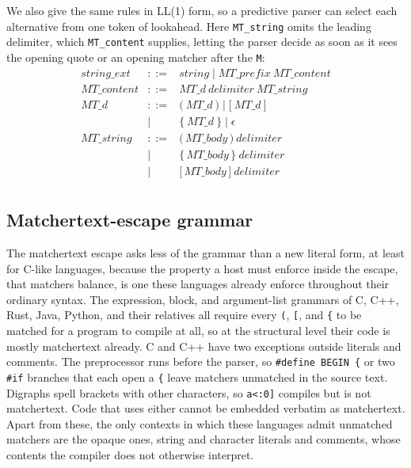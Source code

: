 We also give the same rules in LL(1) form,
so a predictive parser can select each alternative from one token of lookahead.
Here \verb|MT_string| omits the leading delimiter, which \verb|MT_content| supplies,
letting the parser decide as soon as it sees the opening quote or an opening
matcher after the \verb|M|:
\[
\begin{array}{rcl}
\mathit{string\_ext}
  & ::= & \mathit{string} \mid \mathit{MT\_prefix}\ \mathit{MT\_content} \\

\mathit{MT\_content}
  & ::= & \mathit{MT\_d}\ \mathit{delimiter}\ \mathit{MT\_string} \\

\mathit{MT\_d}
  & ::= & \texttt{(}\ \mathit{MT\_d}\ \texttt{)}
          \mid \texttt{[}\ \mathit{MT\_d}\ \texttt{]} \\
  & \mid & \texttt{\{}\ \mathit{MT\_d}\ \texttt{\}} \mid \epsilon \\

\mathit{MT\_string}
  & ::= & \texttt{(}\,\mathit{MT\_body}\,\texttt{)}\ \mathit{delimiter} \\
  & \mid & \texttt{\{}\,\mathit{MT\_body}\,\texttt{\}}\ \mathit{delimiter} \\
  & \mid & \texttt{[}\,\mathit{MT\_body}\,\texttt{]}\ \mathit{delimiter} \\
\end{array}
\]

\subsection{Matchertext-escape grammar}
\label{app:grammar:escape}

The matchertext escape asks less of the grammar than a new literal form,
at least for C-like languages,
because the property a host must enforce inside the escape,
that matchers balance,
is one these languages already enforce throughout their ordinary syntax.
The expression, block, and argument-list grammars of
C, C++, Rust, Java, Python, and their relatives
all require every \verb|(|, \verb|[|, and \verb|{| to be matched
for a program to compile at all,
so at the structural level their code is mostly matchertext already.
C and C++ have two exceptions outside literals and comments.
The preprocessor runs before the parser,
so \verb|#define BEGIN {| or two \verb|#if| branches that each open a \verb|{|
leave matchers unmatched in the source text.
Digraphs spell brackets with other characters,
so \verb|a<:0]| compiles but is not matchertext.
Code that uses either cannot be embedded verbatim as matchertext.
Apart from these, the only contexts in which these languages admit unmatched matchers
are the opaque ones, string and character literals and comments,
whose contents the compiler does not otherwise interpret.

